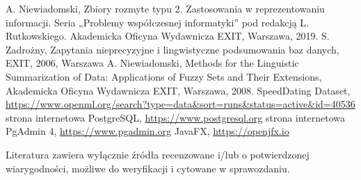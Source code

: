 \documentclass{classrep}
\begin{document}
\begin{thebibliography}{99}
  A. Niewiadomski, Zbiory rozmyte typu 2. Zastosowania w reprezentowaniu informacji.  Seria „Problemy współczesnej informatyki” pod redakcją L. Rutkowskiego. Akademicka Oficyna Wydawnicza EXIT, Warszawa, 2019.
 S. Zadrożny, Zapytania nieprecyzyjne i lingwistyczne podsumowania baz danych, EXIT, 2006, Warszawa
 A. Niewiadomski, Methods for the Linguistic Summarization of Data: Applications of Fuzzy Sets and Their Extensions, Akademicka Oficyna Wydawnicza EXIT, Warszawa, 2008.
 SpeedDating Dataset, \url{https://www.openml.org/search?type=data&sort=runs&status=active&id=40536}
 strona internetowa PostgreSQL, \url{https://www.postgresql.org}
 strona internetowa PgAdmin 4, \url{https://www.pgadmin.org}
 JavaFX, \url{https://openjfx.io}

\end{thebibliography}

Literatura zawiera wyłącznie źródła recenzowane i/lub o potwierdzonej wiarygodności,
możliwe do weryfikacji i cytowane w sprawozdaniu. 
\end{document}
